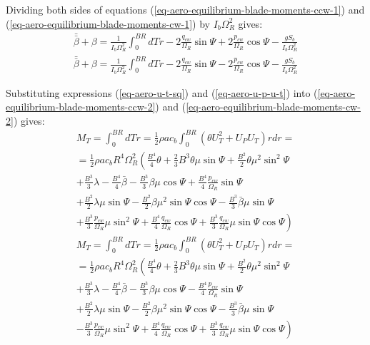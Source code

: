 Dividing both sides of equations (\ref{eq-aero-equilibrium-blade-moments-ccw-1}) and (\ref{eq-aero-equilibrium-blade-moments-cw-1}) by $I_b \Omega_R^2$ gives:
\begin{gather}
  \label{eq-aero-equilibrium-blade-moments-ccw-2}
  \bar{\bar \beta} + \beta
  = \frac{1}{ I_b \Omega_R^2 } \int_{0}^{BR} dT r
  - 2 \frac{q_{cw}}{\Omega_R} \sin \Psi
  + 2 \frac{p_{cw}}{\Omega_R} \cos \Psi
  - \frac{g S_b}{I_b \Omega_R^2} \\
  \label{eq-aero-equilibrium-blade-moments-cw-2}
    \bar{\bar \beta} + \beta
  = \frac{1}{ I_b \Omega_R^2 } \int_{0}^{BR} dT r
  - 2 \frac{q_{cw}}{\Omega_R} \sin \Psi
  - 2 \frac{p_{cw}}{\Omega_R} \cos \Psi
  - \frac{g S_b}{I_b \Omega_R^2}
\end{gather}

Substituting expressions (\ref{eq-aero-u-t-sq}) and (\ref{eq-aero-u-p-u-t}) into (\ref{eq-aero-equilibrium-blade-moments-ccw-2}) and (\ref{eq-aero-equilibrium-blade-moments-cw-2}) gives:
\begin{multline}
  \label{eq-aero-blade-moment-thrust-ccw}
  M_T =
  \int_{0}^{BR} dT r =
  \frac{1}{2} \rho a c_b
  \int_{0}^{BR} \left( \theta U_T^2 + U_P U_T \right) r dr = \\
  =
  \frac{1}{2} \rho a c_b R^4 \Omega_R^2
  \left(
    \frac{B^4}{4} \theta
  + \frac{2}{3} B^3 \theta \mu \sin \Psi
  + \frac{B^2}{2} \theta \mu^2 \sin^2 \Psi
  \right.
  \\
  + \frac{B^3}{3} \lambda
  - \frac{B^4}{4} \bar \beta
  - \frac{B^3}{3} \beta \mu \cos \Psi
  + \frac{B^4}{4} \frac{p_{cw}}{\Omega_R} \sin \Psi \\
  + \frac{B^2}{2} \lambda \mu \sin \Psi
  - \frac{B^2}{2} \beta \mu^2 \sin \Psi \cos \Psi
  - \frac{B^3}{3} \bar \beta \mu \sin \Psi
  \\
  \left.
  + \frac{B^3}{3} \frac{p_{cw}}{\Omega_R} \mu \sin^2 \Psi
  + \frac{B^4}{4} \frac{q_{cw}}{\Omega_R} \cos \Psi
  + \frac{B^3}{3} \frac{q_{cw}}{\Omega_R} \mu \sin \Psi \cos \Psi
  \right)
\end{multline}
\begin{multline}
  \label{eq-aero-blade-moment-thrust-cw}
  M_T =
  \int_{0}^{BR} dT r =
  \frac{1}{2} \rho a c_b
  \int_{0}^{BR} \left( \theta U_T^2 + U_P U_T \right) r dr = \\
  =
  \frac{1}{2} \rho a c_b R^4 \Omega_R^2
  \left(
    \frac{B^4}{4} \theta
  + \frac{2}{3} B^3 \theta \mu \sin \Psi
  + \frac{B^2}{2} \theta \mu^2 \sin^2 \Psi
  \right.
  \\
  + \frac{B^3}{3} \lambda
  - \frac{B^4}{4} \bar \beta
  - \frac{B^3}{3} \beta \mu \cos \Psi
  - \frac{B^4}{4} \frac{p_{cw}}{\Omega_R} \sin \Psi \\
  + \frac{B^2}{2} \lambda \mu \sin \Psi
  - \frac{B^2}{2} \beta \mu^2 \sin \Psi \cos \Psi
  - \frac{B^3}{3} \bar \beta \mu \sin \Psi
  \\
  \left.
  - \frac{B^3}{3} \frac{p_{cw}}{\Omega_R} \mu \sin^2 \Psi
  + \frac{B^4}{4} \frac{q_{cw}}{\Omega_R} \cos \Psi
  + \frac{B^3}{3} \frac{q_{cw}}{\Omega_R} \mu \sin \Psi \cos \Psi
  \right)
\end{multline}

